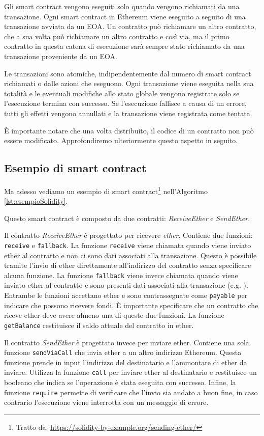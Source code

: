Gli smart contract vengono eseguiti solo quando vengono richiamati da una transazione. Ogni smart contract in Ethereum viene eseguito a seguito 
di una transazione avviata da un EOA. Un contratto può richiamare un altro contratto, che a sua volta può richiamare un altro contratto e così 
via, ma il primo contratto in questa catena di esecuzione sarà sempre stato richiamato da una transazione proveniente da un EOA.

Le transazioni sono atomiche, indipendentemente dal numero di smart contract richiamati o dalle azioni che eseguono. Ogni transazione viene 
eseguita nella sua totalità e le eventuali modifiche allo stato globale vengono registrate solo se l’esecuzione termina con successo. Se 
l’esecuzione fallisce a causa di un errore, tutti gli effetti vengono annullati e la transazione viene registrata come tentata.

È importante notare che una volta distribuito, il codice di un contratto non può essere modificato. Approfondiremo ulteriormente questo 
aspetto in seguito.

\subsection{Esempio di smart contract}\label{subsec:esempioSmartContract}
Ma adesso vediamo un esempio di smart contract\footnote{Tratto da: \url{https://solidity-by-example.org/sending-ether/}} 
nell'Algoritmo \ref*{lst:esempioSolidity}.

Questo smart contract è composto da due contratti: \textit{ReceiveEther} e \textit{SendEther}.

Il contratto \textit{ReceiveEther} è progettato per ricevere \textit{ether}. Contiene due funzioni: {\tt receive} e {\tt fallback}. La funzione {\tt receive} 
viene chiamata quando viene inviato ether al contratto e non ci sono dati associati alla transazione. Questo è possibile tramite l’invio 
di ether direttamente all’indirizzo del contratto senza specificare alcuna funzione. La funzione {\tt fallback} viene invece chiamata quando viene 
inviato ether al contratto e sono presenti dati associati alla transazione (e.g. ). Entrambe le funzioni accettano ether e sono contrassegnate come 
{\tt payable} per indicare che possono ricevere fondi. È importante specificare che un contratto che riceve ether deve avere almeno una di queste 
due funzioni.
La funzione {\tt getBalance} restituisce il saldo attuale del contratto in ether.

Il contratto \textit{SendEther} è progettato invece per inviare ether. Contiene una sola funzione {\tt sendViaCall} che invia ether a un altro indirizzo 
Ethereum. Questa funzione prende in input l’indirizzo del destinatario e l’ammontare di ether da inviare. Utilizza la funzione {\tt call} per inviare 
ether al destinatario e restituisce un booleano che indica se l’operazione è stata eseguita con successo. Infine, la funzione {\tt require} permette 
di verificare che l’invio sia andato a buon fine, in caso contrario l’esecuzione viene interrotta con un messaggio di errore.

